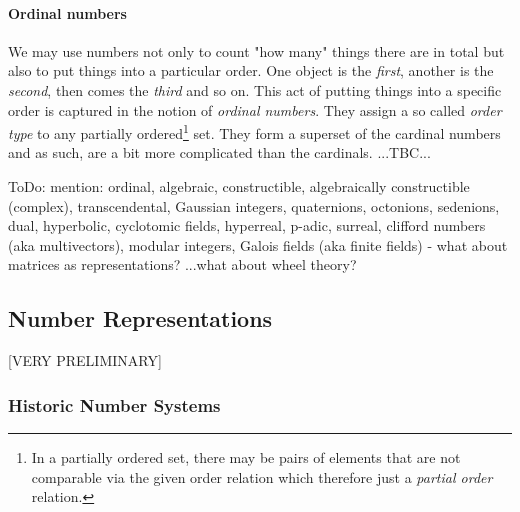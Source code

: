 \paragraph{Ordinal numbers} 
We may use numbers not only to count "how many" things there are in total but also to put things into a particular order. One object is the \emph{first}, another is the \emph{second}, then comes the \emph{third} and so on. This act of putting things into a specific order is captured in the notion of \emph{ordinal numbers}. They assign a so called \emph{order type} to any partially ordered\footnote{In a partially ordered set, there may be pairs of elements that are not comparable via the given order relation which therefore just a \emph{partial order} relation.} set. They form a superset of the cardinal numbers and as such, are a bit more complicated than the cardinals. ...TBC...

\medskip
ToDo: mention: ordinal, algebraic, constructible, algebraically constructible (complex), transcendental, Gaussian integers, quaternions, octonions, sedenions, dual, hyperbolic, cyclotomic fields, hyperreal, p-adic, surreal, clifford numbers (aka multivectors),  modular integers, Galois fields (aka finite fields) - what about matrices as representations? ...what about wheel theory?






\subsection{Number Representations} [VERY PRELIMINARY]

\subsubsection{Historic Number Systems}

